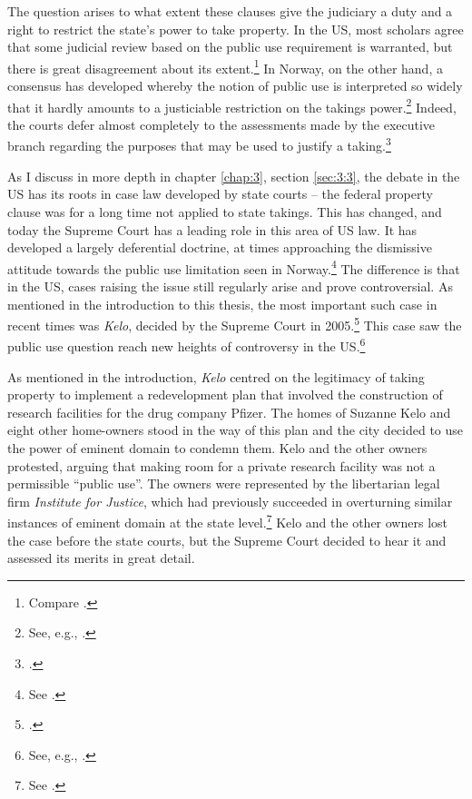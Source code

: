 The question arises to what extent these clauses give the judiciary a duty and a right to restrict the state's power to take property. In the US, most scholars agree that some judicial review based on the public use requirement is warranted, but there is great disagreement about its extent.\footnote{Compare \cite{bell06,bell09,claeys04,sandefur06}.} In Norway, on the other hand, a consensus has developed whereby the notion of public use is interpreted so widely that it hardly amounts to a justiciable restriction on the takings power.\footnote{See, e.g., \cite[368]{aall10}.} Indeed, the courts defer almost completely to the assessments made by the executive branch regarding the purposes that may be used to justify a taking.\footcite[368]{aall10}


As I discuss in more depth in chapter \ref{chap:3}, section \ref{sec:3:3}, the debate in the US has its roots in case law developed by state courts -- the federal property clause was for a long time not applied to state takings. This has changed, and today the Supreme Court has a leading role in this area of US law. It has developed a largely deferential doctrine, at times approaching the dismissive attitude towards the public use limitation seen in Norway.\footnote{See \cite{berman54,midkiff84,kelo05}.} The difference is that in the US, cases raising the issue still regularly arise and prove controversial. As mentioned in the introduction to this thesis, the most important such case in recent times was {\it Kelo}, decided by the Supreme Court in 2005.\footcite{kelo05} This case saw the public use question reach new heights of controversy in the US.\footnote{See, e.g., \cite{somin09}.}

As mentioned in the introduction, {\it Kelo} centred on the legitimacy of taking property to implement a redevelopment plan that involved the construction of research facilities for the drug company Pfizer. The homes of Suzanne Kelo and eight other home-owners stood in the way of this plan and the city decided to use the power of eminent domain to condemn them. Kelo and the other owners protested, arguing that making room for a private research facility was not a permissible ``public use''. The owners were represented by the libertarian legal firm {\it Institute for Justice}, which had previously succeeded in overturning similar instances of eminent domain at the state level.\footnote{See \cite{justice15}.} Kelo and the other owners lost the case before the state courts, but the Supreme Court decided to hear it and assessed its merits in great detail.

